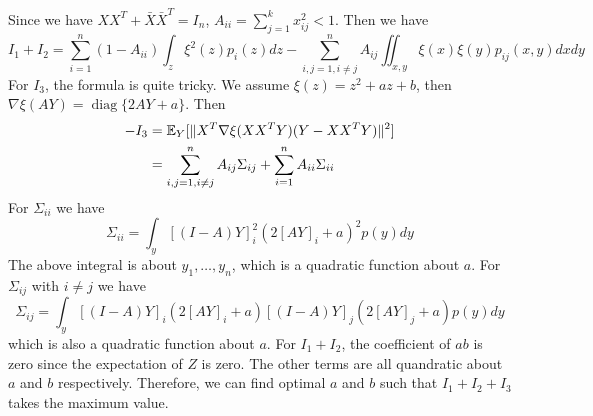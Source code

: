 \documentclass{article}
\DeclarePairedDelimiter\norm{\lVert}{\rVert}
\def\E{\mathbb{E}}
\DeclareMathOperator*{\diag}{diag}
\begin{document}
Since we have $XX^T + \bar{X}\bar{X}^T = I_n$, $A_{ii} = \sum_{j=1}^k x^2_{ij} < 1$. Then we have
\begin{equation}\label{eq:I1plusI2}
I_1+ I_2 =   \sum_{i=1}^n (1-A_{ii}) \int_z \xi^2(z) p_i(z) dz  - \sum_{i,j=1, i \neq j}^n A_{ij} \iint_{x,y} \xi(x)\xi(y) p_{ij}(x,y) dx dy
\end{equation}
For $I_3$, the formula is quite tricky. We assume $\xi(z) = z^2 + a z + b $, then $\nabla \xi (AY) = \diag\{2AY+ a\}$. 
Then
\begin{align*}
-I_3 & = \E_Y[\norm{X^T \nabla\xi(XX^TY)(Y-XX^TY)}^2] \\ 
 & = \sum_{i,j=1, i \neq j}^n A_{ij}\Sigma_{ij} + \sum_{i=1}^n A_{ii}\Sigma_{ii} 
\end{align*}
For $\Sigma_{ii}$ we have
\begin{equation}\label{eq:sigmaii}
\Sigma_{ii} = \int_y [(I - A)Y]^2_i (2[AY]_i + a)^2 p(y)dy
\end{equation}
The above integral is about $y_1, \dots, y_n$, which is a quadratic function about $a$.
For $\Sigma_{ij}$ with $i\neq j$ we have
\begin{equation*}
\Sigma_{ij} = \int_y [(I - A)Y]_i (2[AY]_i + a)[(I - A)Y]_j (2[AY]_j + a) p(y)dy
\end{equation*}
which is also a quadratic function about $a$.
For $I_1 + I_2$, the coefficient of $ab$ is zero since the expectation of $Z$ is zero. The other terms are all quandratic about $a$ and $b$ respectively. Therefore, we can find optimal $a$ and $b$ such that $I_1 + I_2 + I_3$ takes the maximum value.
\end{document}
